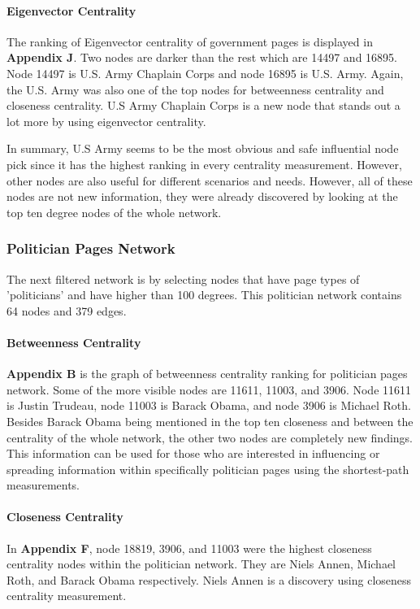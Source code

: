 \documentclass[11pt,twocolumn]{article}
\begin{document}
\paragraph{Eigenvector Centrality}
The ranking of Eigenvector centrality of government pages is displayed in \textbf{Appendix J}. Two nodes are darker than the rest which are 14497 and 16895. Node 14497 is U.S. Army Chaplain Corps and node 16895 is U.S. Army. Again, the U.S. Army was also one of the top nodes for betweenness centrality and closeness centrality. U.S Army Chaplain Corps is a new node that stands out a lot more by using eigenvector centrality.

In summary, U.S Army seems to be the most obvious and safe influential node pick since it has the highest ranking in every centrality measurement. However, other nodes are also useful for different scenarios and needs. However, all of these nodes are not new information, they were already discovered by looking at the top ten degree nodes of the whole network.

\subsubsection{Politician Pages Network}
The next filtered network is by selecting nodes that have page types of 'politicians' and have higher than 100 degrees. This politician network contains 64 nodes and 379 edges. 
\paragraph{Betweenness Centrality}
\textbf{Appendix B} is the graph of betweenness centrality ranking for politician pages network. Some of the more visible nodes are  11611, 11003, and 3906. Node 11611 is Justin Trudeau, node 11003 is Barack Obama, and node 3906 is Michael Roth. Besides Barack Obama being mentioned in the top ten closeness and between the centrality of the whole network, the other two nodes are completely new findings. This information can be used for those who are interested in influencing or spreading information within specifically politician pages using the shortest-path measurements. 

\paragraph{Closeness Centrality}
In \textbf{Appendix F}, node 18819, 3906, and 11003 were the highest closeness centrality nodes within the politician network. They are Niels Annen, Michael Roth, and Barack Obama respectively. Niels Annen is a discovery using closeness centrality measurement.
 
\end{document}

